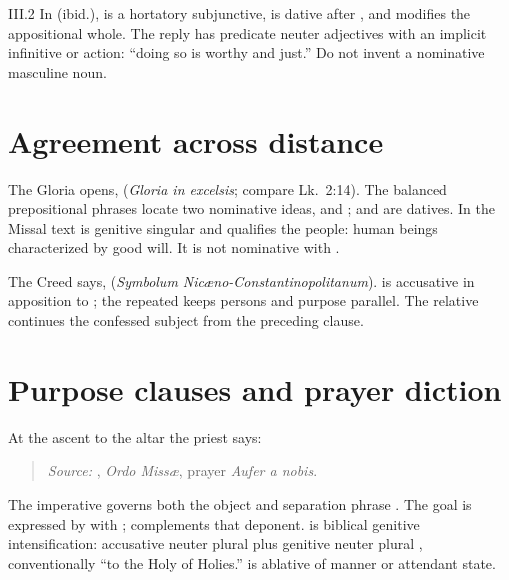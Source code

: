 \begin{courseunit}{III.2}
In  (ibid.),
 is a hortatory subjunctive,  is dative after
, and  modifies the appositional whole. The
reply has predicate neuter adjectives with an implicit infinitive or action:
``doing so is worthy and just.'' Do not invent a nominative masculine noun.

\section{Agreement across distance}

The Gloria opens,  (\emph{Gloria in excelsis}; compare Lk.~2:14). The balanced
prepositional phrases locate two nominative ideas,  and
;  and  are datives. In the Missal text
 is genitive singular and qualifies the people: human
beings characterized by good will. It is not nominative with .

The Creed says,  (\emph{Symbolum Nicæno-Constantinopolitanum}).
 is accusative in apposition to ; the repeated
 keeps persons and purpose parallel. The relative 
continues the confessed subject from the preceding clause.

\section{Purpose clauses and prayer diction}

At the ascent to the altar the priest says:

\begin{quote}

\emph{Source:} \Missal, \emph{Ordo Missæ}, prayer \emph{Aufer a nobis}.
\end{quote}

The imperative  governs both the object  and separation phrase . The goal is expressed by
 with ;  complements that deponent.
 is biblical genitive intensification: accusative
neuter plural  plus genitive neuter plural ,
conventionally ``to the Holy of Holies.''  is ablative of
manner or attendant state.


\end{courseunit}
